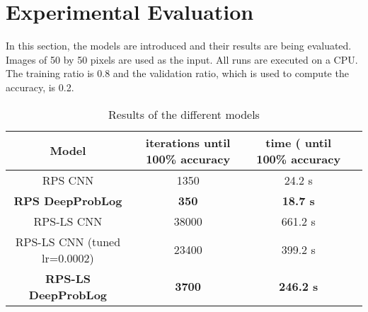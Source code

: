 \section{Experimental Evaluation}
In this section, the models are introduced and their results are being evaluated. Images of 50 by 50 pixels are used as the input. All runs are executed on a CPU. The training ratio is 0.8 and the validation ratio, which is used to compute the accuracy, is 0.2.







\begin{table}[!h]
    \centering
    \begin{tabular}{|c|c|c|c|}
        \hline
        Model & iterations until 100\% accuracy  & time ( until 100\% accuracy    \\
        \hline\hline
        RPS CNN & 1350 & 24.2 s \\
        \hline
        \textbf{RPS DeepProbLog} & \textbf{350} & \textbf{18.7 s} \\
        \hline
        \hline
        RPS-LS CNN & 38000 & 661.2 s\\
        \hline
        RPS-LS CNN (tuned lr=0.0002)& 23400 & 399.2 s\\
        \hline
        \textbf{RPS-LS DeepProbLog} & \textbf{3700} & \textbf{246.2 s}\\
        \hline
    \end{tabular}
    \caption{Results of the different models}
    \label{t1}
    \end{table}